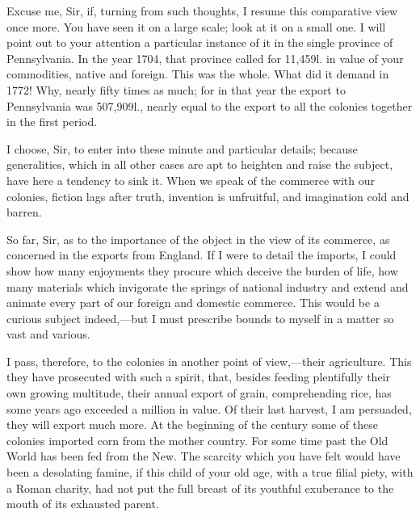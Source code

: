 Excuse me, Sir, if, turning from such thoughts, I resume this comparative view once more. You have seen it on a large scale; look at it on a small one. I will point out to your attention a particular instance of it in the single province of Pennsylvania. In the year 1704, that province called for 11,459l. in value of your commodities, native and foreign. This was the whole. What did it demand in 1772! Why, nearly fifty times as much; for in that year the export to Pennsylvania was 507,909l., nearly equal to the export to all the colonies together in the first period.

I choose, Sir, to enter into these minute and particular details; because generalities, which in all other cases are apt to heighten and raise the subject, have here a tendency to sink it. When we speak of the commerce with our colonies, fiction lags after truth, invention is unfruitful, and imagination cold and barren.

So far, Sir, as to the importance of the object in the view of its commerce, as concerned in the exports from England. If I were to detail the imports, I could show how many enjoyments they procure which deceive the burden of life, how many materials which invigorate the springs of national industry and extend and animate every part of our foreign and domestic commerce. This would be a curious subject indeed,—but I must prescribe bounds to myself in a matter so vast and various.

I pass, therefore, to the colonies in another point of view,—their agriculture. This they have prosecuted with such a spirit, that, besides feeding plentifully their own growing multitude, their annual export of grain, comprehending rice, has some years ago exceeded a million in value. Of their last harvest, I am persuaded, they will export much more. At the beginning of the century some of these colonies imported corn from the mother country. For some time past the Old World has been fed from the New. The scarcity which you have felt would have been a desolating famine, if this child of your old age, with a true filial piety, with a Roman charity, had not put the full breast of its youthful exuberance to the mouth of its exhausted parent.

